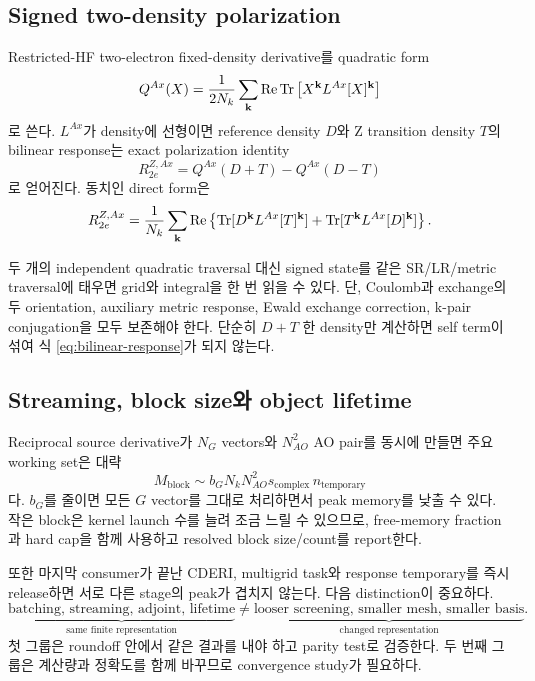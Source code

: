 \subsection{Signed two-density polarization}

Restricted-HF two-electron fixed-density derivative를 quadratic form
\begin{equation}
  Q^{Ax}(X)
  =\frac{1}{2N_k}\sum_{\mathbf{k}}\operatorname{Re}
   \operatorname{Tr}\left[X^{\mathbf{k}}L^{Ax}[X]^{\mathbf{k}}\right]
  \label{eq:quadratic-derivative}
\end{equation}
로 쓴다. $L^{Ax}$가 density에 선형이면 reference density $D$와 Z transition density
$T$의 bilinear response는 exact polarization identity
\begin{equation}
  R_{2e}^{Z,Ax}=Q^{Ax}(D+T)-Q^{Ax}(D-T)
  \label{eq:polarization-identity}
\end{equation}
로 얻어진다. 동치인 direct form은
\begin{equation}
  R_{2e}^{Z,Ax}
  =\frac1{N_k}\sum_{\mathbf{k}}\operatorname{Re}\left\{
    \operatorname{Tr}[D^{\mathbf{k}}L^{Ax}[T]^{\mathbf{k}}]
   +\operatorname{Tr}[T^{\mathbf{k}}L^{Ax}[D]^{\mathbf{k}}]
  \right\}.
  \label{eq:bilinear-response}
\end{equation}

두 개의 independent quadratic traversal 대신 signed state를 같은 SR/LR/metric traversal에
태우면 grid와 integral을 한 번 읽을 수 있다. 단, Coulomb과 exchange의 두 orientation,
auxiliary metric response, Ewald exchange correction, k-pair conjugation을 모두 보존해야
한다. 단순히 $D+T$ 한 density만 계산하면 self term이 섞여 식
\eqref{eq:bilinear-response}가 되지 않는다.

\subsection{Streaming, block size와 object lifetime}

Reciprocal source derivative가 $N_G$ vectors와 $N_{AO}^2$ AO pair를 동시에 만들면 주요
working set은 대략
\begin{equation}
  M_{\mathrm{block}}
  \sim b_GN_kN_{AO}^2s_{\mathrm{complex}}\,n_{\mathrm{temporary}}
  \label{eq:block-working-set}
\end{equation}
다. $b_G$를 줄이면 모든 $G$ vector를 그대로 처리하면서 peak memory를 낮출 수 있다.
작은 block은 kernel launch 수를 늘려 조금 느릴 수 있으므로, free-memory fraction과 hard
cap을 함께 사용하고 resolved block size/count를 report한다.

또한 마지막 consumer가 끝난 CDERI, multigrid task와 response temporary를 즉시 release하면
서로 다른 stage의 peak가 겹치지 않는다. 다음 distinction이 중요하다.
\begin{equation}
  \underbrace{\text{batching, streaming, adjoint, lifetime}}_{\text{same finite representation}}
  \neq
  \underbrace{\text{looser screening, smaller mesh, smaller basis}}_{\text{changed representation}}.
  \label{eq:algebra-vs-approx}
\end{equation}
첫 그룹은 roundoff 안에서 같은 결과를 내야 하고 parity test로 검증한다. 두 번째 그룹은
계산량과 정확도를 함께 바꾸므로 convergence study가 필요하다.

